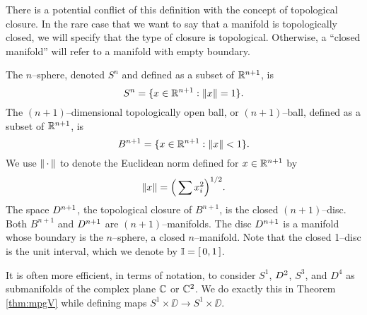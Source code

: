 There is a potential conflict of this definition with the concept of topological closure.
In the rare case that we want to say that a manifold is topologically closed, we will specify that the type of closure is topological.
Otherwise, a ``closed manifold'' will refer to a manifold with empty boundary.

\begin{ex}
	The $n$--sphere, denoted $S^n$ and defined as a subset of $\mathbb{R}^{n+1}$, is
	\[
	S^n = \{x\in\mathbb{R}^{n+1}:\left\lVert x \right\rVert=1\}.
	\]
	The $(n+1)$--dimensional topologically open ball, or $(n+1)$--ball, defined as a subset of $\mathbb{R}^{n+1}$, is
	\[
	B^{n+1} = \{x\in\mathbb{R}^{n+1}:\left\lVert x \right\rVert< 1\}.
	\]
	We use $\left\lVert \,\cdot\, \right\rVert$ to denote the Euclidean norm defined for $x\in\mathbb{R}^{n+1}$ by
	\[
	\left\lVert x \right\rVert = \Big( \sum x_i^2 \Big)^{1/2}.
	\]
	The space $D^{n+1}$, the topological closure of $B^{n+1}$, is the closed $(n+1)$--disc.
	Both $B^{n+1}$ and $D^{n+1}$ are $(n+1)$--manifolds.
	The disc $D^{n+1}$ is a manifold whose boundary is the $n$--sphere, a closed $n$--manifold.
	Note that the closed 1--disc is the unit interval, which we denote by $\mathbb{I}=[\,0,1\,]$.
	
	It is often more efficient, in terms of notation, to consider $S^1$, $D^2$, $S^3$, and $D^4$ as submanifolds of the complex plane $\mathbb{C}$ or $\mathbb{C}^2$.
	We do exactly this in Theorem \ref{thm:mpgV} while defining maps $S^1\times\DD\to S^1\times\DD$.
\end{ex}

